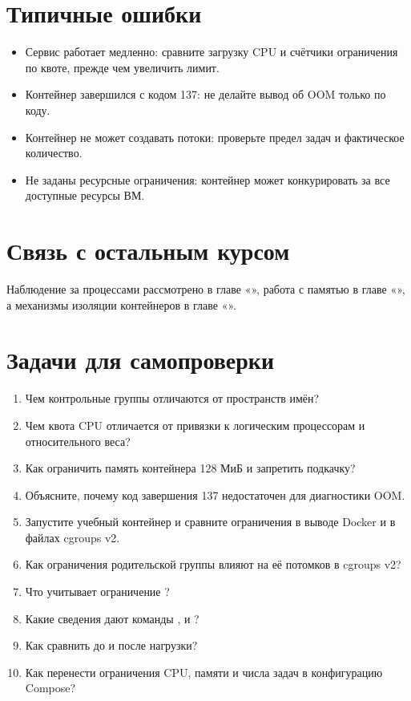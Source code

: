 \section{Типичные ошибки}
\begin{itemize}[nosep]
  \item Сервис работает медленно: сравните загрузку CPU и счётчики ограничения по квоте, прежде чем увеличить лимит.
  \item Контейнер завершился с кодом 137: не делайте вывод об OOM только по коду.
  \item Контейнер не может создавать потоки: проверьте предел задач и фактическое количество.
  \item Не заданы ресурсные ограничения: контейнер может конкурировать за все доступные ресурсы ВМ.
\end{itemize}

\section{Связь с остальным курсом}

Наблюдение за процессами рассмотрено в главе «», работа с памятью в главе «», а механизмы изоляции контейнеров в главе «».

\section{Задачи для самопроверки}
\begin{enumerate}[nosep]
  \item Чем контрольные группы отличаются от пространств имён?
  \item Чем квота CPU отличается от привязки к логическим процессорам и относительного веса?
  \item Как ограничить память контейнера 128 МиБ и запретить подкачку?
  \item Объясните, почему код завершения 137 недостаточен для диагностики OOM.
  \item Запустите учебный контейнер и сравните ограничения в выводе Docker и в файлах cgroups v2.
  \item Как ограничения родительской группы влияют на её потомков в cgroups v2?
  \item Что учитывает ограничение ?
  \item Какие сведения дают команды ,  и ?
  \item Как сравнить  до и после нагрузки?
  \item Как перенести ограничения CPU, памяти и числа задач в конфигурацию Compose?
\end{enumerate}
\par
\clearpage
\endgroup